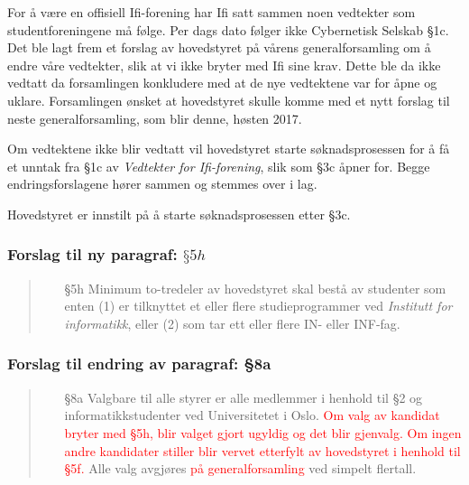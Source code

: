 \documentclass[10pt,norsk,a4paper]{article}
\begin{document}
For å være en offisiell Ifi-forening har Ifi satt sammen noen vedtekter som studentforeningene må følge.
Per dags dato følger ikke Cybernetisk Selskab §1c\footnotemark. Det ble lagt frem et forslag av hovedstyret på vårens generalforsamling om å endre våre vedtekter, slik at vi ikke bryter med Ifi sine krav.
Dette ble da ikke vedtatt da forsamlingen konkludere med at de nye vedtektene var for åpne og uklare. Forsamlingen ønsket at hovedstyret skulle komme med et nytt forslag til neste generalforsamling, som blir denne, høsten 2017.


Om vedtektene ikke blir vedtatt vil hovedstyret starte søknadsprosessen for å få et unntak fra §1c av \textit{Vedtekter for Ifi-forening}, slik som §3c åpner for. Begge endringsforslagene hører sammen og stemmes over i lag.

Hovedstyret er innstilt på å starte søknadsprosessen etter §3c.

\subsubsection{Forslag til ny paragraf: $§5h$}
\begin{quote}
	\begin{enumerate}
		\item[§5h] Minimum to-tredeler av hovedstyret skal bestå av studenter som enten (1) er tilknyttet et eller flere studieprogrammer ved \textit{Institutt for informatikk}, eller (2) som tar ett eller flere IN- eller INF-fag.
	\end{enumerate}
\end{quote}

\subsubsection{Forslag til endring av paragraf: §8a}
\begin{quote}
	\begin{enumerate}
		\item[§8a]
			Valgbare til alle styrer er alle medlemmer i henhold til §2 og informatikkstudenter ved Universitetet i Oslo. \textcolor{red}{Om valg av kandidat bryter med §5h, blir valget gjort ugyldig og det blir gjenvalg. Om ingen andre kandidater stiller blir vervet etterfylt av hovedstyret i henhold til §5f.} Alle valg avgjøres \textcolor{red}{på generalforsamling} ved simpelt flertall.
	\end{enumerate}
\end{quote}
\end{document}
